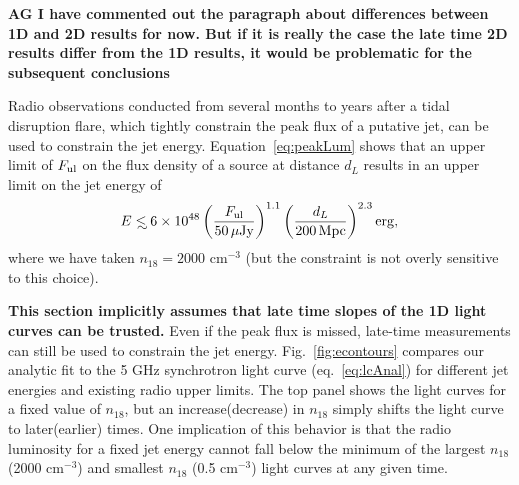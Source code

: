 \documentclass[usenatbib,fleqn]{mnras}
\newcommand\lsim{\mathrel{\rlap{\lower4pt\hbox{\hskip1pt$\sim$}}
    \raise1pt\hbox{$<$}}}
\begin{document}
{\bf AG I have commented out the paragraph about differences between
  1D and 2D results for now. But if it is really the case the late
  time 2D results differ from the 1D results, it would be problematic
  for the subsequent conclusions}

Radio observations conducted from several months to years after a
tidal disruption flare, which tightly constrain the peak flux of a
putative jet, can be used to constrain the jet energy.
Equation~\eqref{eq:peakLum} shows that an upper limit of $F_{\rm ul}$
on the flux density of a source at distance $d_L$ results in an upper
limit on the jet energy of
\begin{equation}
E\lsim 6 \times 10^{48} \left(\frac{F_{\rm ul}}{50 \,\mu{\rm Jy}}\right)^{1.1}
  \left(\frac{d_L}{200 \,{\rm Mpc}}\right)^{2.3} {\rm erg},
\end{equation}
%
where we have taken $n_{18}=2000$ cm$^{-3}$ (but the constraint is not
overly sensitive to this choice). 

{\bf This section implicitly assumes that late time slopes of the 1D
  light curves can be trusted.}  Even if the peak flux is missed,
late-time measurements can still be used to constrain the jet energy.
Fig.~\ref{fig:econtours} compares our analytic fit to the 5 GHz
synchrotron light curve (eq.~\ref{eq:lcAnal}) for different jet
energies and existing radio upper limits.  The top panel shows the
light curves for a fixed value of $n_{18}$, but an increase(decrease)
in $n_{18}$ simply shifts the light curve to later(earlier) times.
One implication of this behavior is that the radio luminosity for a
fixed jet energy cannot fall below the minimum of the largest $n_{18}$
(2000 cm$^{-3}$) and smallest $n_{18}$ (0.5 cm$^{-3}$) light curves at
any given time.
\end{document}
